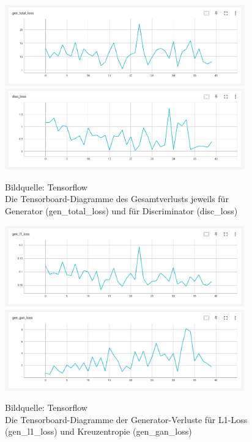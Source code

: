 \begin{figure}[h]
	\centering
	\includegraphics[width=0.925\textwidth]{bilder/pix2pix_progress/gen_total_loss.png}
	\includegraphics[width=0.925\textwidth]{bilder/pix2pix_progress/disc_loss.png}
	\caption[Verlustdiagramm 1]{Bildquelle: Tensorflow \cite{tensorflow2015-whitepaper} \\ Die Tensorboard-Diagramme des Gesamtverlusts jeweils für Generator (gen\_total\_loss) und für Discriminator (disc\_loss) }
	\label{fig:pix2pixprogress3}
	\includegraphics[width=0.925\textwidth]{bilder/pix2pix_progress/gen_l1_loss.png}
	\includegraphics[width=0.925\textwidth]{bilder/pix2pix_progress/gen_gan_loss.png}
	\caption[Verlustdiagramm 2]{Bildquelle: Tensorflow \cite{tensorflow2015-whitepaper} \\ Die Tensorboard-Diagramme der Generator-Verluste für L1-Loss (gen\_l1\_loss) und Kreuzentropie (gen\_gan\_loss)}
	\label{fig:pix2pixprogress4}
\end{figure}

